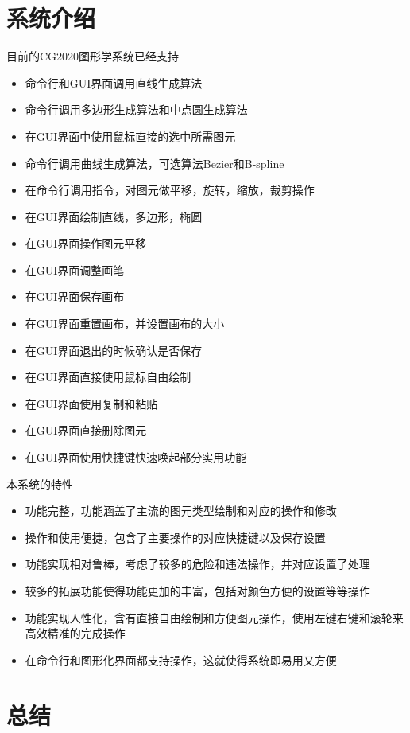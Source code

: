 \documentclass[a4paper,UTF8]{article}
\theoremstyle{definition}
\begin{document}
\section{系统介绍}
目前的CG2020图形学系统已经支持
\begin{itemize}
    \item 命令行和GUI界面调用直线生成算法
    \item 命令行调用多边形生成算法和中点圆生成算法
    \item 在GUI界面中使用鼠标直接的选中所需图元
    \item 命令行调用曲线生成算法，可选算法Bezier和B-spline
    \item 在命令行调用指令，对图元做平移，旋转，缩放，裁剪操作
    \item 在GUI界面绘制直线，多边形，椭圆
    \item 在GUI界面操作图元平移
    \item 在GUI界面调整画笔
    \item 在GUI界面保存画布
    \item 在GUI界面重置画布，并设置画布的大小
    \item 在GUI界面退出的时候确认是否保存
    \item 在GUI界面直接使用鼠标自由绘制
    \item 在GUI界面使用复制和粘贴
    \item 在GUI界面直接删除图元
    \item 在GUI界面使用快捷键快速唤起部分实用功能
\end{itemize}

本系统的特性
\begin{itemize}
    \item 功能完整，功能涵盖了主流的图元类型绘制和对应的操作和修改
    \item 操作和使用便捷，包含了主要操作的对应快捷键以及保存设置
    \item 功能实现相对鲁棒，考虑了较多的危险和违法操作，并对应设置了处理
    \item 较多的拓展功能使得功能更加的丰富，包括对颜色方便的设置等等操作
    \item 功能实现人性化，含有直接自由绘制和方便图元操作，使用左键右键和滚轮来
    高效精准的完成操作
    \item 在命令行和图形化界面都支持操作，这就使得系统即易用又方便
\end{itemize}

\section{总结}
\end{document}
